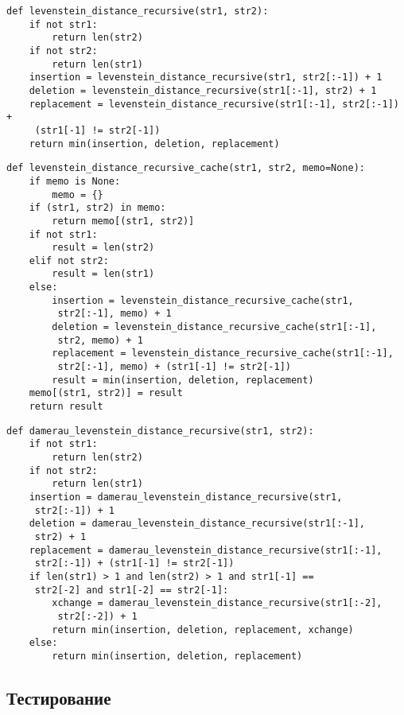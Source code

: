 \begin{lstlisting}[caption=Рекурсивный алгоритм Левенштейна без кеширования, label=lev_recursion_classic]
def levenstein_distance_recursive(str1, str2):
    if not str1:
        return len(str2)
    if not str2:
        return len(str1)
    insertion = levenstein_distance_recursive(str1, str2[:-1]) + 1
    deletion = levenstein_distance_recursive(str1[:-1], str2) + 1
    replacement = levenstein_distance_recursive(str1[:-1], str2[:-1]) +
     (str1[-1] != str2[-1])
    return min(insertion, deletion, replacement)
\end{lstlisting}

\begin{lstlisting}[caption=Рекурсивный алгоритм Левенштейна с кешированием, label=lev_recursion_optimized]
def levenstein_distance_recursive_cache(str1, str2, memo=None):
    if memo is None:
        memo = {}
    if (str1, str2) in memo:
        return memo[(str1, str2)]
    if not str1:
        result = len(str2)
    elif not str2:
        result = len(str1)
    else:
        insertion = levenstein_distance_recursive_cache(str1,
         str2[:-1], memo) + 1
        deletion = levenstein_distance_recursive_cache(str1[:-1],
         str2, memo) + 1
        replacement = levenstein_distance_recursive_cache(str1[:-1],
         str2[:-1], memo) + (str1[-1] != str2[-1])
        result = min(insertion, deletion, replacement)
    memo[(str1, str2)] = result
    return result
\end{lstlisting}

\begin{lstlisting}[caption=Рекурсивная реализация алгоритма Дамерау~---~Левенштейна без кеширования, label=dlev_recursion]
def damerau_levenstein_distance_recursive(str1, str2):
    if not str1:
        return len(str2)
    if not str2:
        return len(str1)
    insertion = damerau_levenstein_distance_recursive(str1,
     str2[:-1]) + 1
    deletion = damerau_levenstein_distance_recursive(str1[:-1],
     str2) + 1
    replacement = damerau_levenstein_distance_recursive(str1[:-1],
     str2[:-1]) + (str1[-1] != str2[-1])
    if len(str1) > 1 and len(str2) > 1 and str1[-1] ==
     str2[-2] and str1[-2] == str2[-1]:
        xchange = damerau_levenstein_distance_recursive(str1[:-2],
         str2[:-2]) + 1
        return min(insertion, deletion, replacement, xchange)
    else:
        return min(insertion, deletion, replacement)
\end{lstlisting}

\subsection{Тестирование}


